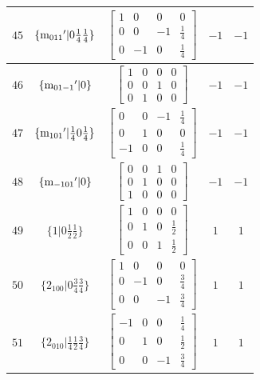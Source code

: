 \documentclass[fleqn,8pt]{jsarticle}
\begin{document}
\begin{longtable}{ccccc}
$ 45 $ & $ \{{\rm m}_{011}{}'|0 \frac{1}{4} \frac{1}{4}\} $ & $ \begin{bmatrix} 1 & 0 & 0 & 0 \\ 0 & 0 & -1 & \frac{1}{4} \\ 0 & -1 & 0 & \frac{1}{4} \end{bmatrix} $ & $ -1 $ & $ -1 $ \\ \hline
$ 46 $ & $ \{{\rm m}_{01-1}{}'|0\} $ & $ \begin{bmatrix} 1 & 0 & 0 & 0 \\ 0 & 0 & 1 & 0 \\ 0 & 1 & 0 & 0 \end{bmatrix} $ & $ -1 $ & $ -1 $ \\ \hline
$ 47 $ & $ \{{\rm m}_{101}{}'|\frac{1}{4} 0 \frac{1}{4}\} $ & $ \begin{bmatrix} 0 & 0 & -1 & \frac{1}{4} \\ 0 & 1 & 0 & 0 \\ -1 & 0 & 0 & \frac{1}{4} \end{bmatrix} $ & $ -1 $ & $ -1 $ \\ \hline
$ 48 $ & $ \{{\rm m}_{-101}{}'|0\} $ & $ \begin{bmatrix} 0 & 0 & 1 & 0 \\ 0 & 1 & 0 & 0 \\ 1 & 0 & 0 & 0 \end{bmatrix} $ & $ -1 $ & $ -1 $ \\ \hline
$ 49 $ & $ \{1|0 \frac{1}{2} \frac{1}{2}\} $ & $ \begin{bmatrix} 1 & 0 & 0 & 0 \\ 0 & 1 & 0 & \frac{1}{2} \\ 0 & 0 & 1 & \frac{1}{2} \end{bmatrix} $ & $ 1 $ & $ 1 $ \\ \hline
$ 50 $ & $ \{2{}_{100}|0 \frac{3}{4} \frac{3}{4}\} $ & $ \begin{bmatrix} 1 & 0 & 0 & 0 \\ 0 & -1 & 0 & \frac{3}{4} \\ 0 & 0 & -1 & \frac{3}{4} \end{bmatrix} $ & $ 1 $ & $ 1 $ \\ \hline
$ 51 $ & $ \{2{}_{010}|\frac{1}{4} \frac{1}{2} \frac{3}{4}\} $ & $ \begin{bmatrix} -1 & 0 & 0 & \frac{1}{4} \\ 0 & 1 & 0 & \frac{1}{2} \\ 0 & 0 & -1 & \frac{3}{4} \end{bmatrix} $ & $ 1 $ & $ 1 $ \\ \hline

\end{longtable}
\end{document}
